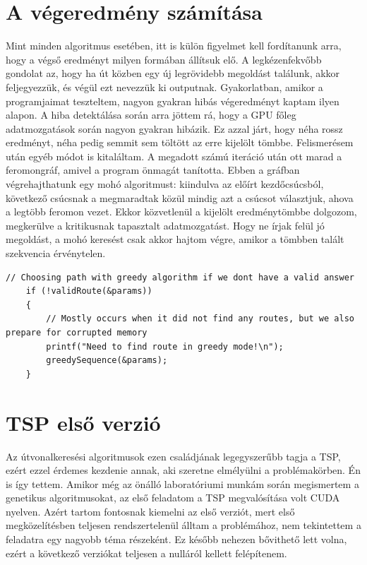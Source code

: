 \section{A végeredmény számítása}
\label{sec:getResult}
Mint minden algoritmus esetében, itt is külön figyelmet kell fordítanunk arra, hogy a végső eredményt milyen formában állítsuk elő. A legkézenfekvőbb gondolat az, hogy ha út közben egy új legrövidebb megoldást találunk, akkor feljegyezzük, és végül ezt nevezzük ki outputnak. Gyakorlatban, amikor a programjaimat teszteltem, nagyon gyakran hibás végeredményt kaptam ilyen alapon. A hiba detektálása során arra jöttem rá, hogy a GPU főleg adatmozgatások során nagyon gyakran hibázik. Ez azzal járt, hogy néha rossz eredményt, néha pedig semmit sem töltött az erre kijelölt tömbbe. Felismerésem után egyéb módot is kitaláltam. A megadott számú iteráció után ott marad a feromongráf, amivel a program önmagát tanította. Ebben a gráfban végrehajthatunk egy mohó algoritmust: kiindulva az előírt kezdőcsúcsból, következő csúcsnak a megmaradtak közül mindig azt a csúcsot választjuk, ahova a legtöbb feromon vezet. Ekkor közvetlenül a kijelölt eredménytömbbe dolgozom, megkerülve a kritikusnak tapasztalt adatmozgatást. Hogy ne írjak felül jó megoldást, a mohó keresést csak akkor hajtom végre, amikor a tömbben talált szekvencia érvénytelen.

\begin{lstlisting}[style=CStyle,showstringspaces=false]
	// Choosing path with greedy algorithm if we dont have a valid answer
	if (!validRoute(&params)) 
	{
		// Mostly occurs when it did not find any routes, but we also prepare for corrupted memory
		printf("Need to find route in greedy mode!\n");
		greedySequence(&params);
	}
\end{lstlisting}


\section{TSP első verzió} \label{TSP_v1_SubSection}
Az útvonalkeresési algoritmusok ezen családjának legegyszerűbb tagja a TSP, ezért ezzel érdemes kezdenie annak, aki szeretne elmélyülni a problémakörben. Én is így tettem. Amikor még az önálló laboratóriumi munkám során megismertem a genetikus algoritmusokat, az első feladatom a TSP megvalósítása volt CUDA nyelven. Azért tartom fontosnak kiemelni az első verziót, mert első megközelítésben teljesen rendszertelenül álltam a problémához, nem tekintettem a feladatra egy nagyobb téma részeként. Ez később nehezen bővithető lett volna, ezért a következő verziókat teljesen a nulláról kellett felépítenem.


